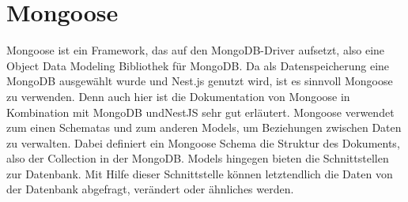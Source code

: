 \section{Mongoose}
Mongoose ist ein Framework, das auf den MongoDB-Driver aufsetzt, also eine Object Data Modeling Bibliothek für MongoDB. Da als Datenspeicherung eine MongoDB ausgewählt wurde und Nest.js genutzt wird, ist es sinnvoll Mongoose zu verwenden. Denn auch hier ist die Dokumentation von Mongoose in Kombination mit MongoDB undNestJS sehr gut erläutert. Mongoose verwendet zum einen Schematas und zum anderen Models, um Beziehungen zwischen Daten zu verwalten. Dabei definiert ein Mongoose Schema die Struktur des Dokuments, also der Collection in der MongoDB. Models hingegen bieten die Schnittstellen zur Datenbank. Mit Hilfe dieser Schnittstelle können letztendlich die Daten von der Datenbank abgefragt, verändert oder ähnliches werden. \cite{mongoose}